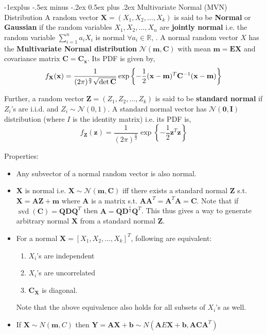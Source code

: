 \documentclass[10pt,landscape]{article}
\makeatletter
\renewcommand{\subsection}{\@startsection{subsection}{2}{0mm}%
                                {-1explus -.5ex minus -.2ex}%
                                {0.5ex plus .2ex}%
                                {\normalfont\normalsize\bfseries}}
\makeatother
\begin{document}
\begin{multicols*}{3}
	\subsection{Multivariate Normal (MVN) Distribution}
	A random vector $\mathbf{X} = (X_1, X_2, \dots, X_k)$ is said to be \textbf{Normal} or \textbf{Gaussian} if the random variables $X_{1}, X_{2}, \ldots, X_{n}$ are \textbf{jointly normal} i.e. the random variable $\sum\limits_{i=1}^{n} a_{i} X_{i}$ is normal $\forall a_{i} \in \mathbb{R}$, . 
	A normal random vector $X$ has the \textbf{Multivariate Normal distribution} $\mathcal{N}(\mathbf{m}, \mathbf{C})$ with mean $\mathbf{m} = \mathbf{EX}$ and covariance matrix $\mathbf{C} = \mathbf{C}_\mathbf{x}$. Its PDF is given by,
	\[
		f_{\mathbf{X}}(\mathbf{x})=\frac{1}{(2\pi)^{\large{\frac{n}{2}}} \sqrt{\det\mathbf{C}}} \exp \left\{-\frac{1}{2} (\mathbf{x}-\mathbf{m})^T \mathbf{C}^{-1}(\mathbf{x}-\mathbf{m}) \right\}
	\]
									
	Further, a random vector $\mathbf{Z} = (Z_1, Z_2, \dots, Z_k)$ is said to be \textbf{standard normal} if $Z_{i}$'s are i.i.d. and $Z_{i} \sim \mathcal{N}(0,1)$. A standard normal vector has $\mathcal{N}(\mathbf{0}, \mathbf{I})$ distribution (where $I$ is the identity matrix) i.e. its PDF is,
	\[
		f_{\mathbf{Z}}(\mathbf{z})=\frac{1}{(2 \pi)^{\frac{n}{2}}} \exp \left\{-\frac{1}{2} \mathbf{z}^{T} \mathbf{z}\right\}
	\]
									
	Properties:
	\begin{itemize}
		\item Any subvector of a normal random vector is also normal.
		\item $\mathbf{X}$ is normal i.e. $\mathbf{X} \sim \mathcal{N}(\mathbf{m}, \mathbf{C})$ iff there exists a standard normal $\mathbf{Z}$ s.t. $\mathbf{X = AZ + m}$ where $\mathbf{A}$ is a matrix s.t. $\mathbf{A} \mathbf{A}^{T}= \mathbf{A}^{T}\mathbf{A}=\mathbf{C}$. Note that if $\operatorname{svd}(\mathbf{C})=\mathbf{Q} \mathbf{D} \mathbf{Q}^T$ then $\mathbf{A}=\mathbf{Q} \mathbf{D}^{\frac{1}{2}} \mathbf{Q}^T$. This thus gives a way to generate arbitrary normal $\mathbf{X}$ from a standard normal $\mathbf{Z}$.
		      				      						          
		\item For a normal $\mathbf{X} = [X_1, X_2, \dots, X_k]^T$, following are equivalent:
		      \begin{enumerate}
		      	\item $X_i$'s are independent 
		      	\item $X_i$'s are uncorrelated
		      	\item $\mathbf{C_X}$ is diagonal.
		      \end{enumerate}
		      Note that the above equivalence also holds for all subsets of $X_i$'s as well.
		\item If $\mathbf{X} \sim N(\mathbf{m}, {C})$ then $\mathbf{Y=A X+b} \sim N(\mathbf{A}E\mathbf{X}+\mathbf{b},\mathbf{A} \mathbf{C} \mathbf{A}^T)$
	\end{itemize}
										

\end{multicols*}
\end{document}
